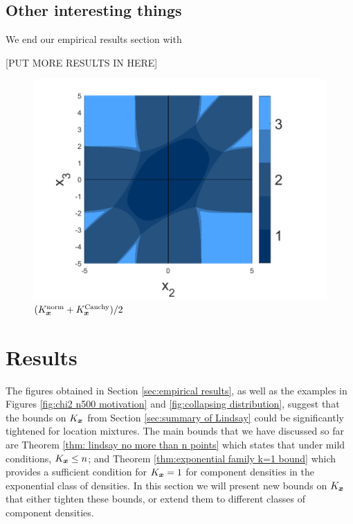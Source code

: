 	\subsection{Other interesting things}
	We end our empirical results section with 

	[PUT MORE RESULTS IN HERE]

	\begin{figure}
		\centering
		\includegraphics[width = \textwidth]{Figures/Mixtures/norm_cauchy_compare_flag_graph.png}
		\caption{$(K_{\bm{{x}}}^\mathrm{norm} + K_{\bm{{x}}}^\mathrm{Cauchy}) / 2$}
		\label{fig:compare cauchy norm flag graph}
	\end{figure}

	\section{Results}
		\label{sec:mixture results}
		The figures obtained in Section \ref{sec:empirical results}, as well as the examples in Figures \ref{fig:chi2 n500 motivation} and \ref{fig:collapsing distribution}, suggest that the bounds on $K_{\bm{{x}}}$ from Section \ref{sec:summary of Lindsay} could be significantly tightened for location mixtures. The main bounds that we have discussed so far are Theorem \ref{thm: lindsay no more than n points} which states that under mild conditions, $K_{\bm{{x}}} \leq n$; and Theorem \ref{thm:exponential family k=1 bound} which provides a sufficient condition for $K_{\bm{{x}}} = 1$ for component densities in the exponential class of densities. In this section we will present new bounds on $K_{\bm{{x}}}$ that either tighten these bounds, or extend them to different classes of component densities.


